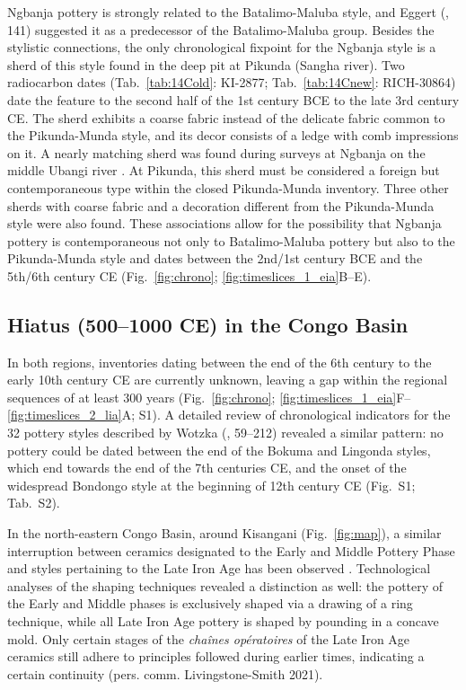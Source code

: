 \documentclass[smallextended,natbib]{svjour3}       %
\begin{document}
Ngbanja pottery is strongly related to the Batalimo-Maluba style, and Eggert (\citeyear{Eggert.1987c}, 141) suggested it as a predecessor of the Batalimo-Maluba group. Besides the stylistic connections, the only chronological fixpoint for the Ngbanja style is a sherd of this style found in the deep pit at Pikunda (Sangha river). Two radiocarbon dates (Tab.~\ref{tab:14Cold}: KI-2877; Tab.~\ref{tab:14Cnew}: RICH-30864) date the feature to the second half of the 1st century BCE to the late 3rd century CE. The sherd exhibits a coarse fabric instead of the delicate fabric common to the Pikunda-Munda style, and its decor consists of a ledge with comb impressions on it. A nearly matching sherd was found during surveys at Ngbanja on the middle Ubangi river \citep[83 Fig.~26.7--8]{Seidensticker.2021e}. At Pikunda, this sherd must be considered a foreign but contemporaneous type within the closed Pikunda-Munda inventory. Three other sherds with coarse fabric and a decoration different from the Pikunda-Munda style were also found. These associations allow for the possibility that Ngbanja pottery is contemporaneous not only to Batalimo-Maluba pottery but also to the Pikunda-Munda style and dates between the 2nd/1st century BCE and the 5th/6th century CE (Fig.~\ref{fig:chrono}; \ref{fig:timeslices_1_eia}B--E).

\subsection*{Hiatus (500--1000 CE) in the Congo Basin}

In both regions, inventories dating between the end of the 6th century to the early 10th century CE are currently unknown, leaving a gap within the regional sequences of at least 300 years (Fig.~\ref{fig:chrono}; \ref{fig:timeslices_1_eia}F--\ref{fig:timeslices_2_lia}A; S1). A detailed review of chronological indicators for the 32 pottery styles described by Wotzka (\citeyear{Wotzka.1995}, 59--212) revealed a similar pattern: no pottery could be dated between the end of the Bokuma and Lingonda styles, which end towards the end of the 7th centuries CE, and the onset of the widespread Bondongo style at the beginning of 12th century CE (Fig.~S1; Tab.~S2).

In the north-eastern Congo Basin, around Kisangani (Fig.~\ref{fig:map}), a similar interruption between ceramics designated to the Early and Middle Pottery Phase and styles pertaining to the Late Iron Age has been observed \citep[Fig.~\ref{fig:chrono}; S1]{LivingstoneSmith.2017}. Technological analyses of the shaping techniques revealed a distinction as well: the pottery of the Early and Middle phases is exclusively shaped via a drawing of a ring technique, while all Late Iron Age pottery is shaped by pounding in a concave mold. Only certain stages of the \textit{chaînes opératoires} of the Late Iron Age ceramics still adhere to principles followed during earlier times, indicating a certain continuity (pers. comm. Livingstone-Smith 2021).
\end{document}
